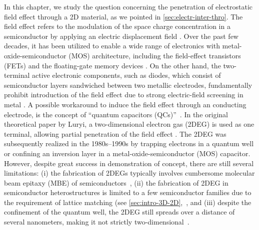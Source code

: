In this chapter, we study the question concerning the penetration of
electrostatic field effect through a 2D material, as we pointed in
\autoref{sec:electr-inter-thro}.
%
The field effect refers to the modulation of the space charge
concentration in a semiconductor by applying an electric displacement
field \autocite{Sze_2006_Mosfets}.  Over the past few decades, it has been
utilized to enable a wide range of electronics with
metal-oxide-semiconductor (MOS) architecture, including the
field-effect transistors (FETs) and the floating-gate memory devices
\autocite{Sze_2006_Mosfets}.
%
On the other hand, the two-terminal active electronic components, such
as diodes, which consist of semiconductor layers sandwiched between
two metallic electrodes, fundamentally prohibit introduction of the
field effect due to strong electric-field screening in metal
\autocite{Ehrenreich_2001_solidstate_phys}.
%
A possible workaround to induce the field effect through an conducting
electrode, is the concept of ``quantum capacitors
(QCs)''~\autocite{Luryi_1988_Quantum}.  In the original theoretical paper
by Luryi, a two-dimensional electron gas (2DEG) is used as one
terminal, allowing partial penetration of the field effect
\autocite{Luryi_1988_Quantum}.
%
The 2DEG was subsequently realized in the 1980s--1990s by trapping
electrons in a quantum well \autocite{Davies_1997_book,Ihn_2009_book} or
confining an inversion layer in a metal-oxide-semiconductor (MOS)
capacitor\autocite{Sze_2006_Mosfets}.
%
However, despite great success in demonstration of concept, there are
still several limitations: (i) the fabrication of 2DEGs typically
involves cumbersome molecular beam epitaxy (MBE) of
semiconductors~\autocite{Chang_2012_MBE}, (ii) the fabrication of 2DEG in
semiconductor heterostructures is limited to a few semiconductor
families due to the requirement of lattice matching (see
\autoref{sec:intro-3D-2D},~\autocite{Stormer_1979_2DEG}, and (iii) despite
the confinement of the quantum well, the 2DEG still spreads over a
distance of several nano\-meters, making it not strictly
two-dimensional~\autocite{Ihn_2009_book}.
%

